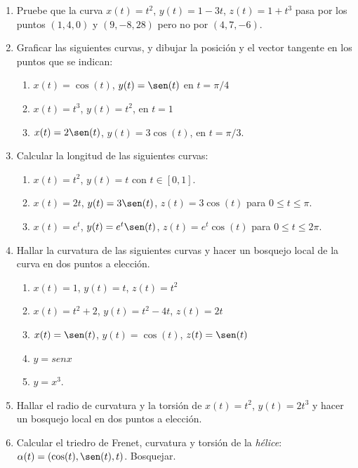 \documentclass[11pt]{book}
\theoremstyle{definicion}
\theoremstyle{teorema}
\theoremstyle{ejemplo}
\begin{document}
\begin{enumerate}

\item Pruebe que la curva $x(t)=t^{2}$, $y(t)=1-3t$, $z(t)=1+t^{3}$ pasa por los puntos $(1,4,0)$ y $(9,-8,28)$ pero no por $(4,7,-6)$.

\item Graficar las siguientes curvas, y dibujar la posición y el vector tangente en los puntos que se indican:
\begin{enumerate}
\item $x(t)=\cos(t)$, $y(t)=\sen(t)$ en  $t=\pi/4$
\item $x(t)=t^{3}$, $y(t)=t^{2}$, en  $t=1$
\item $x(t)=2 \sen(t)$, $y(t)=3\cos(t)$, en  $t=\pi/3$.     
 \end{enumerate}
 
\item Calcular la longitud de las siguientes curvas:
\begin{enumerate}

\item $x(t)=t^2$, $y(t)=t$ con $t\in[0,1]$.
\item $x(t)=2t$, $y(t)=3\sen(t)$, $z(t)=3\cos(t)$ para $0\leq t \leq \pi$.
\item $x(t)=e^{t}$, $y(t)=e^{t}\sen(t)$, $z(t)=e^{t }\cos(t)$ para $0\leq t \leq 2\pi$.

\end{enumerate}


\item Hallar la curvatura de las siguientes curvas y hacer un bosquejo local de la curva en dos puntos a elecci\'on.

\begin{enumerate}
 \item      $x(t)=1$, $y(t)=t$, $z(t)=t^{2}$
  \item      $x(t)=t^{2}+2$, $y(t)=t^{2}-4t$, $z(t)=2t$
   \item      $x(t)=\sen(t)$, $y(t)=\cos(t)$, $z(t)=\sen(t)$
   \item $y= sen x$
   \item $y=x^{3}$.
\end{enumerate}


\item Hallar el radio de curvatura y la torsi\'on de $x(t)=t^{2}$, $y(t)=2t^{3}$ y hacer un bosquejo local en dos puntos a elecci\'on.

\item Calcular el triedro de Frenet, curvatura y torsi\'on de la \emph{h\'elice}: $\alpha(t)=(\cos(t),\sen(t),t)$. Bosquejar.


\end{enumerate}
\end{document}

